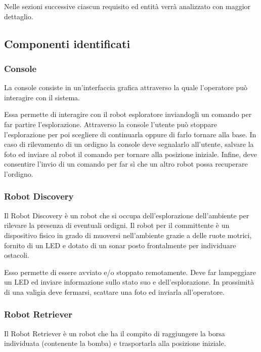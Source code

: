 Nelle sezioni successive ciascun requisito ed entità verrà analizzato con maggior dettaglio.

\subsection{Componenti identificati}

\subsubsection{Console}

La console consiste in un'interfaccia grafica attraverso la quale l'operatore può interagire con il sistema.

Essa permette di interagire con il robot esploratore inviandogli un comando per far partire l'esplorazione.
Attraverso la console l'utente può stoppare l'esplorazione per poi scegliere di continuarla oppure di farlo tornare alla base.
In caso di rilevamento di un ordigno la console deve segnalarlo all'utente, salvare la foto ed inviare al robot il comando per tornare alla posizione iniziale.
Infine, deve consentire l'invio di un comando per far sì che un altro robot possa recuperare l'ordigno.

\subsubsection{Robot Discovery}

Il Robot Discovery è un robot che si occupa dell'esplorazione dell'ambiente per rilevare la presenza di eventuali ordigni.
Il robot per il committente è un dispositivo fisico in grado di muoversi nell'ambiente grazie a delle ruote motrici, fornito di un LED
e dotato di un sonar posto frontalmente per individuare ostacoli.

Esso permette di essere avviato e/o stoppato remotamente.
Deve far lampeggiare un LED ed inviare informazione sullo stato suo e dell'esplorazione.
In prossimità di una valigia deve fermarsi, scattare una foto ed inviarla all'operatore.

\subsubsection{Robot Retriever}

Il Robot Retriever è un robot che ha il compito di raggiungere la borsa individuata (contenente la bomba) e trasportarla alla posizione iniziale.

